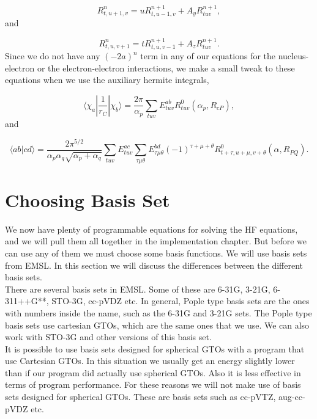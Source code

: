 \documentclass[a4paper,norsk,11pt,twoside]{report}
\begin{document}
\begin{equation}
R^n_{t,u+1,v} = u R^{n+1}_{t, u-1, v} 
+ A_y R^{n+1}_{tuv} ,
\label{nucelec_2_int}
\end{equation}
and

\begin{equation}
R^n_{t,u,v+1} = 
t R^{n+1}_{t, u, v-1} 
+ A_z R^{n+1}_{tuv} .
\label{nucelec_3_int}
\end{equation}
Since we do not have any $(-2a)^n$ term in any of our equations for the nucleus-electron or the 
electron-electron interactions, we make a small tweak to these equations when we use the auxiliary hermite integrals, 

\begin{equation}
\langle \chi_a | \frac{1}{r_C} | \chi_b \rangle = 
\frac{2 \pi}{\alpha_p} 
\sum_{tuv} 
E_{tuv}^{ab} 
R^0_{tuv}(\alpha_p, R_{cP}) ,
\end{equation}
and

\begin{equation}
\langle a b | c d \rangle = 
\frac{2 \pi^{5/2}}{\alpha_p \alpha_q \sqrt{\alpha_p + \alpha_q}}
\sum_{tuv} E_{tuv}^{ac} \sum_{\tau \mu \theta} E_{\tau \mu \theta}^{bd} 
\left( -1 \right)^{\tau + \mu + \theta}
R^0_{t + \tau, u + \mu, v + \theta}(\alpha, R_{PQ}) .
\end{equation}

\section{Choosing Basis Set}
We now have plenty of programmable equations for solving the HF
equations, and we will pull them all together in the implementation
chapter. But before we can use any of them we must choose some basis
functions. We will use basis sets from EMSL. In this section we will
discuss the differences between the different basis sets. \\

There are several basis sets in EMSL. Some of these are 6-31G, 3-21G,
6-311++G**, STO-3G, cc-pVDZ etc. In general, Pople type basis sets are
the ones with numbers inside the name, such as the 6-31G and
3-21G sets. The Pople type basis sets use cartesian GTOs, which are the same
ones that we use. We can also work with STO-3G and other versions of this
basis set. \\

It is possible to use basis sets designed for spherical GTOs with a program that use Cartesian GTOs. In this situation we usually get an energy slightly lower than if our program did actually use spherical GTOs. Also it is less effective in terms of program performance. For these reasons we will not make use of basis sets designed for spherical GTOs. These are basis sets such as cc-pVTZ, aug-cc-pVDZ etc. 
\end{document}
